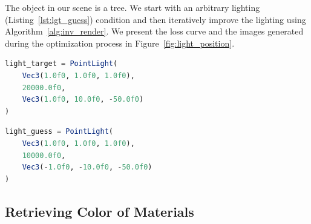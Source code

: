 \documentclass{juliacon}
\begin{document}
The object in our scene is a tree. We start with an arbitrary lighting (Listing~\ref{lst:lgt_guess}) condition and then iteratively improve the lighting using Algorithm~\ref{alg:inv_render}. We present the loss curve and the images generated during the optimization process in Figure~\ref{fig:light_position}.

\noindent
\begin{minipage}{\linewidth}
\begin{lstlisting}[caption = {Target Lighting Conditions},
                   label = {lst:lgt_target},
                   captionpos = b,
                   language = Julia]
light_target = PointLight(
    Vec3(1.0f0, 1.0f0, 1.0f0),
    20000.0f0,
    Vec3(1.0f0, 10.0f0, -50.0f0)
)
\end{lstlisting}
\end{minipage}

\noindent
\begin{minipage}{\linewidth}
\begin{lstlisting}[caption = {Initial Guess of Lighting Conditions},
                   label = {lst:lgt_guess},
                   captionpos = b,
                   language = Julia]
light_guess = PointLight(
    Vec3(1.0f0, 1.0f0, 1.0f0),
    10000.0f0,
    Vec3(-1.0f0, -10.0f0, -50.0f0)
)
\end{lstlisting}
\end{minipage}

\subsection{Retrieving Color of Materials}
\label{sec:mat_color}
\end{document}
